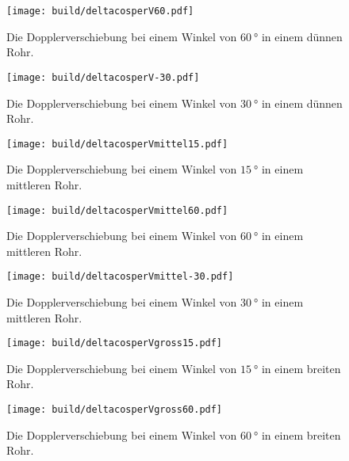 \begin{figure}
 \centering
 \caption{Die Dopplerverschiebung bei einem Winkel von $\SI{60}{\degree}$ in einem dünnen Rohr.}
 \texttt{[image: build/deltacosperV60.pdf]}
 \label{fig:k60}
\end{figure}

\begin{figure}
 \centering
 \caption{Die Dopplerverschiebung bei einem Winkel von $\SI{30}{\degree}$ in einem dünnen Rohr.}
 \texttt{[image: build/deltacosperV-30.pdf]}
 \label{fig:k30}
\end{figure}

\begin{figure}
 \centering
 \caption{Die Dopplerverschiebung bei einem Winkel von $\SI{15}{\degree}$ in einem mittleren Rohr.}
 \texttt{[image: build/deltacosperVmittel15.pdf]}
 \label{fig:m15}
\end{figure}

\begin{figure}
 \centering
 \caption{Die Dopplerverschiebung bei einem Winkel von $\SI{60}{\degree}$ in einem mittleren Rohr.}
 \texttt{[image: build/deltacosperVmittel60.pdf]}
 \label{fig:m60}
\end{figure}

\begin{figure}
 \centering
 \caption{Die Dopplerverschiebung bei einem Winkel von $\SI{30}{\degree}$ in einem mittleren Rohr.}
 \texttt{[image: build/deltacosperVmittel-30.pdf]}
 \label{fig:m30}
\end{figure}

\begin{figure}
 \centering
 \caption{Die Dopplerverschiebung bei einem Winkel von $\SI{15}{\degree}$ in einem breiten Rohr.}
 \texttt{[image: build/deltacosperVgross15.pdf]}
 \label{fig:g15}
\end{figure}

\begin{figure}
 \centering
 \caption{Die Dopplerverschiebung bei einem Winkel von $\SI{60}{\degree}$ in einem breiten Rohr.}
 \texttt{[image: build/deltacosperVgross60.pdf]}
 \label{fig:g60}
\end{figure}

